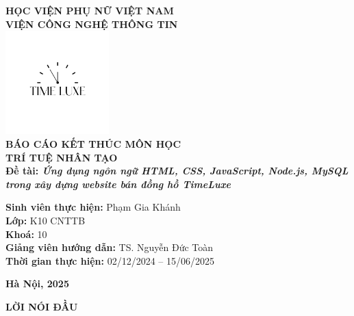 \documentclass[a4paper,12pt]{report}
\begin{document}
\begin{titlepage}
\begin{mdframed}[linewidth=4pt, linecolor=black]
    \centering
{\bfseries\LARGE HỌC VIỆN PHỤ NỮ VIỆT NAM\\[0.2cm]
VIỆN CÔNG NGHỆ THÔNG TIN}\\[1cm]

\includegraphics[width=0.3\textwidth]{static/logo TIME LUXE.png}\\[1.2cm]

{\bfseries\LARGE BÁO CÁO KẾT THÚC MÔN HỌC\\[0.2cm]
TRÍ TUỆ NHÂN TẠO}\\[1cm]

{\bfseries\Large Đề tài: \textit{Ứng dụng ngôn ngữ HTML, CSS, JavaScript, Node.js, MySQL trong xây dựng website bán đồng hồ TimeLuxe}}\\[1.5cm]

\begin{flushleft}
\textbf{Sinh viên thực hiện:} Phạm Gia Khánh\\[0.2cm]
\textbf{Lớp:} K10 CNTTB\\[0.2cm]
\textbf{Khoá:} 10\\[0.2cm]
\textbf{Giảng viên hướng dẫn:} TS. Nguyễn Đức Toàn\\[0.2cm]
\textbf{Thời gian thực hiện:} 02/12/2024 -- 15/06/2025\\
\end{flushleft}
\vspace{1.5cm}
\textbf{Hà Nội, 2025}
\end{mdframed}
\end{titlepage}
\newpage

\newpage
\tableofcontents
\newpage

\newpage

\pagestyle{plain}
\renewcommand{\listfigurename}{DANH MỤC HÌNH ẢNH}
\listoffigures
\newpage

\begin{center}
{\bfseries\Large LỜI NÓI ĐẦU}
\end{center}
\vspace{1em}
\end{document}
